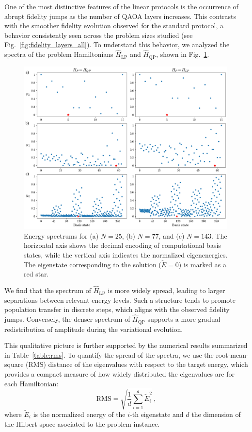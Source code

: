 One of the most distinctive features of the linear protocols is the occurrence of abrupt fidelity jumps as the number of QAOA layers increases. This contrasts with the smoother fidelity evolution observed for the standard protocol, a behavior consistently seen across the problem sizes studied (see Fig.~\ref{fig:fidelity_layers_all}). To understand this behavior, we analyzed the spectra of the problem Hamiltonians $\hat{H}_\mathrm{LP}$ and $\hat{H}_\mathrm{QP}$, shown in Fig.~\ref{fig:spectrums}.
\begin{figure}[h]
    \centering
    \includegraphics[width=0.99\textwidth]{05-discussion/figs/energy_spectrums.pdf}
    \caption{Energy spectrums for (a) $N=25$, (b) $N=77$, and (c) $N=143$. The horizontal axis shows the decimal encoding of computational basis states, while the vertical axis indicates the normalized eigenenergies. The eigenstate corresponding to the solution ($\widetilde{E}=0$) is marked as a red star.}
    \label{fig:spectrums}
\end{figure}
We find that the spectrum of $\hat{H}_\mathrm{LP}$ is more widely spread, leading to larger separations between relevant energy levels. Such a structure tends to promote population transfer in discrete steps, which aligns with the observed fidelity jumps. Conversely, the denser spectrum of $\hat{H}_\mathrm{QP}$ supports a more gradual redistribution of amplitude during the variational evolution.

This qualitative picture is further supported by the numerical results summarized in Table~\ref{table:rms}. To quantify the spread of the spectra, we use the root-mean-square (RMS) distance of the eigenvalues with respect to the target energy, which provides a compact measure of how widely distributed the eigenvalues are for each Hamiltonian:
\begin{equation}
    \textrm{RMS} = \sqrt{\dfrac{1}{d} \sum_{i=1}^{d}\widetilde{E}_i^2}\,,
    \label{eq:rms}
\end{equation}
where $\widetilde{E}_i$ is the normalized energy of the $i$-th eigenstate and $d$ the dimension of the Hilbert space asociated to the problem instance.


